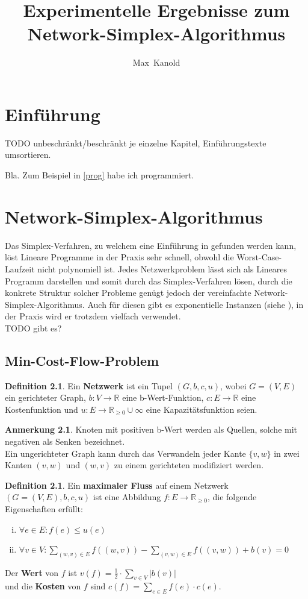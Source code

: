 \documentclass[a4paper,twoside,ngerman]{report}
\author{Max~Kanold}
\title{Experimentelle Ergebnisse zum Network-Simplex-Algorithmus}
\theoremstyle{plain}
\theoremstyle{definition}
\newtheorem{defn}[thm]{Definition}
\newtheorem*{anm}{Anmerkung}
\begin{document}
\maketitle
\tableofcontents

\newpage
\chapter{Einführung}
TODO unbeschränkt/beschränkt je einzelne Kapitel, Einführungstexte umsortieren.

Bla. Zum Beispiel in \cref{prog} habe ich programmiert.

\newpage
\chapter{Network-Simplex-Algorithmus}
Das Simplex-Verfahren, zu welchem eine Einführung in \cite{NSAbook} gefunden werden kann, löst Lineare Programme in der Praxis sehr schnell, obwohl die Worst-Case-Laufzeit nicht polynomiell ist. Jedes Netzwerkproblem lässt sich als Lineares Programm darstellen und somit durch das Simplex-Verfahren lösen, durch die konkrete Struktur solcher Probleme genügt jedoch der vereinfachte Network-Simplex-Algorithmus. Auch für diesen gibt es exponentielle Instanzen (siehe \cite{Exponential}), in der Praxis wird er trotzdem vielfach verwendet.\\
TODO gibt es?

\section{Min-Cost-Flow-Problem}
\begin{defn}Ein \textbf{Netzwerk} ist ein Tupel $(G,b,c,u)$, wobei $G = (V,E)$ ein gerichteter Graph, $b : V\rightarrow\mathbb{R}$ eine b-Wert-Funktion, $c : E\rightarrow\mathbb{R}$ eine Kostenfunktion und $u : E\rightarrow\mathbb{R}_{\geq 0}\cup \infty$ eine Kapazitätsfunktion seien.\end{defn}
\begin{anm}Knoten mit positiven b-Wert werden als Quellen, solche mit negativen als Senken bezeichnet.\\
Ein ungerichteter Graph kann durch das Verwandeln jeder Kante $\{v,w\}$ in zwei Kanten $(v,w)$ und $(w,v)$ zu einem gerichteten modifiziert werden.\end{anm}

\begin{defn}\label{DefMaxFlow}Ein \textbf{maximaler Fluss} auf einem Netzwerk $(G=(V,E),b,c,u)$ ist eine Abbildung $f : E\rightarrow\mathbb{R}_{\geq 0}$, die folgende Eigenschaften erfüllt:
\begin{enumerate}[(i)]
\item $\forall e\in E : f(e)\leq u(e) $
\item $\forall v\in V : \sum_{(w,v)\in E} f((w,v)) - \sum_{(v,w)\in E} f((v,w)) + b(v) = 0$\label{DefMaxFlowII}
\end{enumerate}
Der \textbf{Wert} von $f$ ist
$v(f) = \frac{1}{2}\cdot\sum_{v\in V} |b(v)|$\\
und die \textbf{Kosten} von $f$ sind
$c(f) = \sum_{e\in E} f(e)\cdot c(e)$.
\end{defn}
\end{document}

